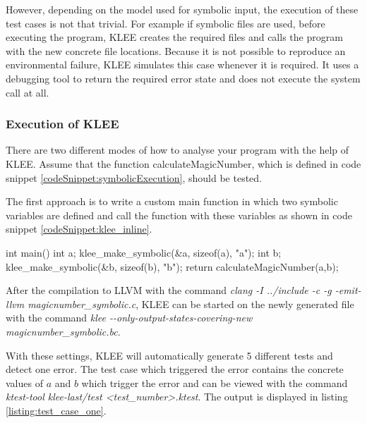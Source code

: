 However, depending on the model used for symbolic input, the execution of these test cases is not that trivial. For example if symbolic files are used, before executing the program, KLEE creates the required files and calls the program with the new concrete file locations. 
Because it is not possible to reproduce an environmental failure, KLEE simulates this case whenever it is required. It uses a debugging tool to return the required error state and does not execute the system call at all.

\subsubsection{Execution of KLEE}
There are two different modes of how to analyse your program with the help of KLEE. Assume that the function calculateMagicNumber, which is defined in code snippet \ref{codeSnippet:symbolicExecution}, should be tested.

The first approach is to write a custom main function in which two symbolic variables are defined and call the function with these variables as shown in code snippet \ref{codeSnippet:klee_inline}.
\begin{codesnippet}[caption={Main function which defines two symbolic variables and calls the function calculateMagicNumber of code snippet \ref{codeSnippet:symbolicExecution}}, label={codeSnippet:klee_inline}]
int main() {
  int a;
  klee_make_symbolic(&a, sizeof(a), "a");
  int b;
  klee_make_symbolic(&b, sizeof(b), "b");
  return calculateMagicNumber(a,b);
}
\end{codesnippet}

After the compilation to LLVM with the command \textit{clang -I ../include -c -g -emit-llvm magicnumber\_symbolic.c}, KLEE can be started on the newly generated file with the command \textit{klee -{}-only-output-states-covering-new magicnumber\_symbolic.bc}.

With these settings, KLEE will automatically generate 5 different tests and detect one error. 
The test case which triggered the error contains the concrete values of $a$ and $b$ which trigger the error and can be viewed with the command \textit{ktest-tool klee-last/test \textless test\_number\textgreater.ktest}.
The output is displayed in listing \ref{listing:test_case_one}.


